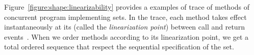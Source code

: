 %
Figure~\ref{figure:shape:linearizability} provides a examples of trace of methods of concurrent program implementing sets.
In the trace, each method takes effect
instantaneously at its (called the \emph{linearization point})
between call and return events~\cite{HeWi:linearizability}. When we order methods according to its linearization point, we get a total ordered sequence that respect the sequential specification of the set.



\endgroup
